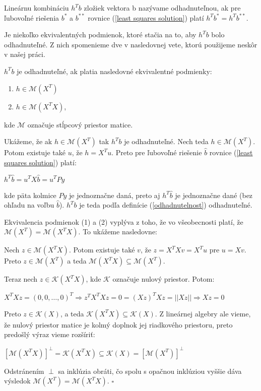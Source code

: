 \begin{defin}
\label{odhadnutelnost}
Lineárnu kombináciu $h^T b$ zložiek vektora b nazývame odhadnuteľnou,
ak pre ľubovoľné riešenia $b^*$ a $b^{**}$ rovnice (\ref{least squares solution}) platí $h^T b^* = h^T b^{**}$.
\end{defin}

Je niekoľko ekvivalentných podmienok, ktoré stačia na to, aby $h^T b$ bolo odhadnuteľné. 
Z nich spomenieme dve v nasledovnej vete, ktorú použijeme neskôr v našej práci.

\begin{theorem}
\label{veta1}
$h^T b$ je odhadnuteľné, ak platia nasledovné ekvivalentné podmienky:
\begin{enumerate}
  \item $h \in \mathcal{M}(X^T)$
  \item $h \in \mathcal{M}(X^T X)$,
\end{enumerate}
kde $\mathcal{M}$ označuje stĺpcový priestor matice.
\end{theorem}

\begin{dokaz}
Ukážeme, že ak $h \in \mathcal{M}(X^T)$ tak $h^T b$ je odhadnuteľné.
Nech teda $h \in \mathcal{M}(X^T)$. Potom existuje také $u$, že $h = X^T u$.
Preto pre ľubovoľné riešenie $\hat{b}$ rovnice (\ref{least squares solution}) platí:

\begin{center}
$
h^T \hat{b} = u^T X \hat{b} = u^T P y
$
\end{center}

kde päta kolmice $Py$ je jednoznačne daná, preto aj $h^T \hat{b}$ je jednoznačne dané (bez ohľadu na voľbu $\hat{b}$).
$h^T b$ je teda podľa definície (\ref{odhadnutelnost}) odhadnuteľné.

Ekvivalencia podmienok (1) a (2) vyplýva z toho, že vo všeobecnosti platí, že $\mathcal{M}(X^T) = \mathcal{M}(X^T X)$.
To ukážeme nasledovne:

Nech $z \in \mathcal{M}(X^T X)$. Potom existuje také $v$, že $z = X^T X v = X^T u$ pre $u = X v$.
Preto $z \in \mathcal{M}(X^T)$ a teda $\mathcal{M}(X^T X) \subseteq \mathcal{M}(X^T)$.

Teraz nech $z \in \mathcal{K}(X^T X)$, kde $\mathcal{K}$ označuje nulový priestor. Potom:

\begin{center}
$
X^T X z = (0, 0, \ldots, 0)^T \Rightarrow z^T X^T X z = 0 = (Xz)^T Xz = ||Xz|| \Rightarrow Xz = 0
$
\end{center}

Preto $z \in \mathcal{K}(X)$, a teda $\mathcal{K}(X^T X) \subseteq \mathcal{K}(X)$.
Z lineárnej algebry ale vieme, že nulový priestor matice je kolmý doplnok jej riadkového priestoru,
preto predošlý výraz vieme rozšíriť:
\begin{center}
$
[\mathcal{M}(X^T X)]^{\perp} = \mathcal{K}(X^T X) \subseteq \mathcal{K}(X) = [\mathcal{M}(X^T)]^{\perp}
$
\end{center}

Odstránením $\perp$ sa inklúzia obráti, čo spolu s opačnou inklúziou vyššie dáva výsledok $\mathcal{M}(X^T) = \mathcal{M}(X^T X)$.
$\square$
\end{dokaz}

